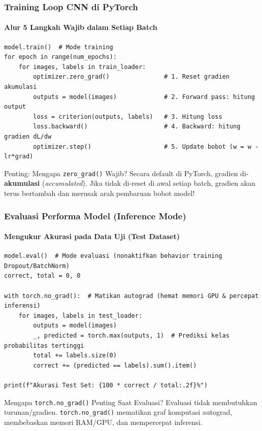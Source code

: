 \documentclass[t,aspectratio=169,xcolor=dvipsnames]{beamer}
\begin{document}
\begin{frame}[fragile]
    \frametitle{Training Loop CNN di PyTorch}
    \framesubtitle{Alur 5 Langkah Wajib dalam Setiap Batch}
    \scriptsize

\begin{verbatim}
model.train()  # Mode training
for epoch in range(num_epochs):
    for images, labels in train_loader:
        optimizer.zero_grad()               # 1. Reset gradien akumulasi
        outputs = model(images)             # 2. Forward pass: hitung output
        loss = criterion(outputs, labels)   # 3. Hitung loss
        loss.backward()                     # 4. Backward: hitung gradien dL/dw
        optimizer.step()                    # 5. Update bobot (w = w - lr*grad)
\end{verbatim}

    \begin{alertblock}{Penting: Mengapa \texttt{zero\_grad()} Wajib?}
        Secara default di PyTorch, gradien di-\textbf{akumulasi} (\textit{accumulated}). Jika tidak di-reset di awal setiap batch, gradien akan terus bertambah dan merusak arah pembaruan bobot model!
    \end{alertblock}
\end{frame}

\begin{frame}[fragile]
    \frametitle{Evaluasi Performa Model (Inference Mode)}
    \framesubtitle{Mengukur Akurasi pada Data Uji (Test Dataset)}
    \scriptsize

\begin{verbatim}
model.eval()  # Mode evaluasi (nonaktifkan behavior training Dropout/BatchNorm)
correct, total = 0, 0

with torch.no_grad():  # Matikan autograd (hemat memori GPU & percepat inferensi)
    for images, labels in test_loader:
        outputs = model(images)
        _, predicted = torch.max(outputs, 1)  # Prediksi kelas probabilitas tertinggi
        total += labels.size(0)
        correct += (predicted == labels).sum().item()

print(f"Akurasi Test Set: {100 * correct / total:.2f}%")
\end{verbatim}

    \begin{exampleblock}{Mengapa \texttt{torch.no\_grad()} Penting Saat Evaluasi?}
        Evaluasi tidak membutuhkan turunan/gradien. \texttt{torch.no\_grad()} mematikan graf komputasi autograd, membebaskan memori RAM/GPU, dan mempercepat inferensi.
    \end{exampleblock}
\end{frame}
\end{document}
